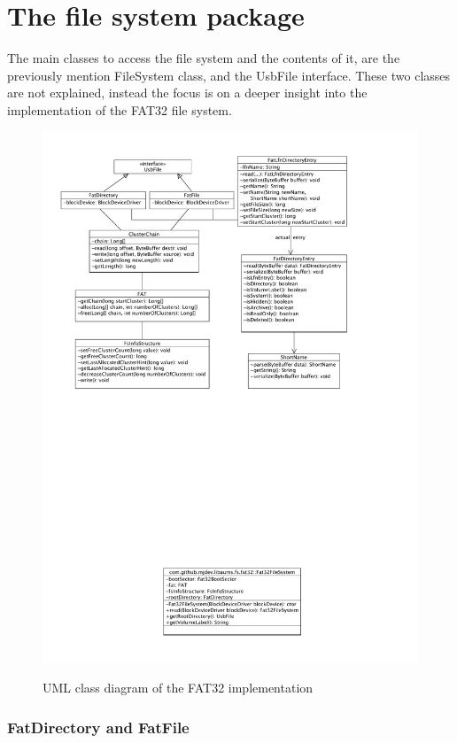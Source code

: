 \section{The file system package}

The main classes to access the file system and the contents of it, are the previously mention FileSystem class, and the UsbFile interface. These two classes are not explained, instead the focus is on a deeper insight into the implementation of the FAT32 file system.

\begin{figure}[h!]
\caption{UML class diagram of the FAT32 implementation}
\centering
\includegraphics[scale=1.0]{figures/fat_package}
\label{figure:fat_package}
\end{figure}

\subsubsection{FatDirectory and FatFile}

